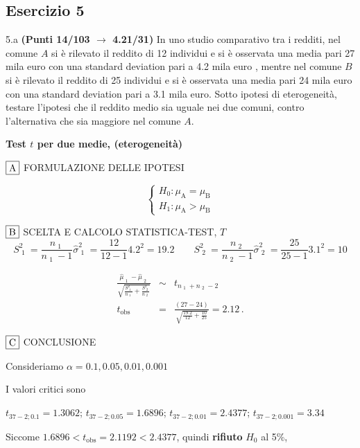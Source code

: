 \documentclass[
  11pt,
]{book}
\theoremstyle{mytheoremstyle}
\theoremstyle{mydefstyle}
\newenvironment{sol}
  {
  \begin{tcolorbox}[enhanced,breakable,arc=0.1mm,boxrule=1pt,colback=white,colframe=iblue,
  title=\bf \fontfamily{lmss}\selectfont \hspace{.5 cm} Soluzione,drop fuzzy shadow]

}{
\end{tcolorbox}
  }
\begin{document}
\subsection{Esercizio 5}\label{esercizio-5-21}

5.a \textbf{(Punti 14/103 \(\rightarrow\) 4.21/31)} In uno studio comparativo tra i redditi, nel comune \(A\) si è rilevato il reddito di 12 individui e si è osservata una media pari 27 mila euro con una standard deviation pari a 4.2 mila euro , mentre nel comune \(B\) si è rilevato il reddito di 25 individui e si è osservata una media pari 24 mila euro con una standard deviation pari a 3.1 mila euro.
Sotto ipotesi di eterogeneità, testare l'ipotesi che il reddito medio sia uguale nei due comuni, contro l'alternativa che sia maggiore nel comune \(A\).

\begin{sol}
\textbf{Test \(t\) per due medie, (eterogeneità)}

\(\fbox{A}\) FORMULAZIONE DELLE IPOTESI

\[\begin{cases}
   H_0: \mu_\text{A} = \mu_\text{B} \\
   H_1: \mu_\text{A} > \mu_\text{B} 
   \end{cases}\]

\(\fbox{B}\) SCELTA E CALCOLO STATISTICA-TEST, \(T\)
\[
     S^2_\text{ 1 }=\frac{n_\text{ 1 }}{n_\text{ 1 }-1}\hat\sigma^2_\text{ 1 }=\frac{ 12 }{ 12 -1} 4.2 ^2= 19.2  \qquad
     S^2_\text{ 2 }=\frac{n_\text{ 2 }}{n_\text{ 2 }-1}\hat\sigma^2_\text{ 2 }=\frac{ 25 }{ 25 -1} 3.1 ^2= 10 
   \]

\begin{eqnarray*}
   \frac{\hat\mu_\text{ 1 } - \hat\mu_\text{ 2 }}
   {\sqrt{\frac {S^2_\text{ 1 }}{n_\text{ 1 }}+\frac {S^2_\text{ 2 }}{n_\text{ 2 }}}}&\sim&t_{n_\text{ 1 }+n_\text{ 2 }-2}\\
   t_{\text{obs}}
   &=& \frac{ ( 27 -  24 )} {\sqrt{\frac{ 19.2 }{ 12 }+\frac{ 10 }{ 25 }}}
   =   2.12 \, .
   \end{eqnarray*}

\(\fbox{C}\) CONCLUSIONE

Consideriamo \(\alpha=0.1, 0.05, 0.01, 0.001\)

I valori critici sono

\(t_{37-2;0.1}=1.3062\); \(t_{37-2;0.05}=1.6896\); \(t_{37-2;0.01}=2.4377\); \(t_{37-2;0.001}=3.34\)

Siccome \(1.6896<t_\text{obs}=2.1192<2.4377\), quindi \textbf{rifiuto} \(H_0\) al 5\%,


\end{sol}
\end{document}
